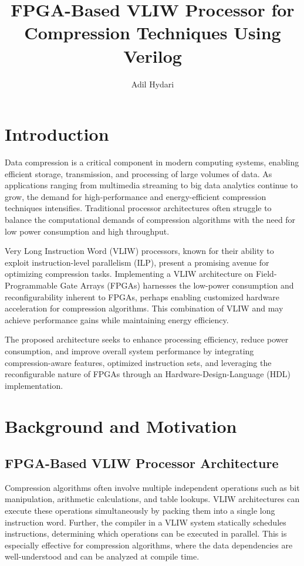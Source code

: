 \documentclass[sigconf]{acmart}
\title{FPGA-Based VLIW Processor for Compression Techniques Using Verilog}
\author{Adil Hydari}
\affiliation{
	\institution{Rutgers University}
	\city{Edison, NJ}
	\country{United States}
}
\begin{document}
	\maketitle
	
	\section{Introduction}
	Data compression is a critical component in modern computing systems, enabling efficient storage, transmission, and processing of large volumes of data. As applications ranging from multimedia streaming to big data analytics continue to grow, the demand for high-performance and energy-efficient compression techniques intensifies. Traditional processor architectures often struggle to balance the computational demands of compression algorithms with the need for low power consumption and high throughput.
	
	Very Long Instruction Word (VLIW) processors, known for their ability to exploit instruction-level parallelism (ILP), present a promising avenue for optimizing compression tasks. Implementing a VLIW architecture on Field-Programmable Gate Arrays (FPGAs) harnesses the low-power consumption and reconfigurability inherent to FPGAs, perhaps enabling customized hardware acceleration for compression algorithms. This combination of VLIW and  may achieve performance gains while maintaining energy efficiency.
	
	The proposed architecture seeks to enhance processing efficiency, reduce power consumption, and improve overall system performance by integrating compression-aware features, optimized instruction sets, and leveraging the reconfigurable nature of FPGAs through an Hardware-Design-Language (HDL) implementation.
	
	\section{Background and Motivation}
	\subsection{FPGA-Based VLIW Processor Architecture}
	Compression algorithms often involve multiple independent operations such as bit manipulation, arithmetic calculations, and table lookups. VLIW architectures can execute these operations simultaneously by packing them into a single long instruction word. Further, the compiler in a VLIW system statically schedules instructions, determining which operations can be executed in parallel. This is especially effective for compression algorithms, where the data dependencies are well-understood and can be analyzed at compile time.
	
\end{document}
